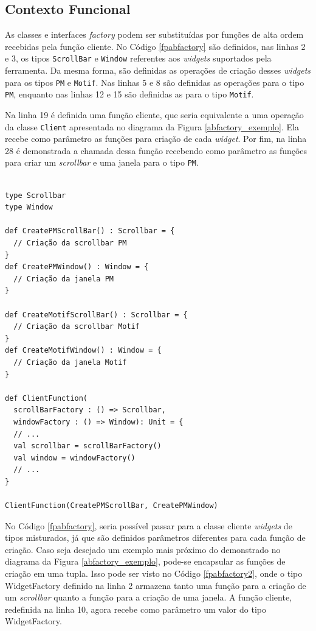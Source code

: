 \subsection*{Contexto Funcional}

As classes e interfaces \textit{factory} podem 
ser substituídas por funções de alta ordem 
recebidas pela função cliente. 
No Código \ref{fpabfactory} são definidos, 
nas linhas 2 e 3,  
os tipos \texttt{ScrollBar} e \texttt{Window} referentes aos 
\textit{widgets} suportados pela ferramenta. 
Da mesma forma, são definidas as operações de 
criação desses \textit{widgets} para os tipos 
\texttt{PM} e \texttt{Motif}. Nas linhas 5 e 8 são definidas as 
operações para o tipo \texttt{PM}, enquanto nas linhas 
12 e 15 são definidas as para o tipo \texttt{Motif}. 

Na linha 19 é definida uma função cliente, 
que seria equivalente a uma operação da classe 
\texttt{Client} apresentada no diagrama da Figura 
\ref{abfactory_exemplo}. Ela 
recebe como parâmetro as funções para criação de 
cada \textit{widget}. Por fim, na linha 28 é 
demonstrada a chamada dessa função recebendo 
como parâmetro as funções para criar um 
\textit{scrollbar} e uma janela para o tipo 
\texttt{PM}.

\begin{lstlisting}[caption={Abstract Factory Funcional.},label=fpabfactory]
    
type Scrollbar
type Window

def CreatePMScrollBar() : Scrollbar = {
  // Criação da scrollbar PM
}
def CreatePMWindow() : Window = {
  // Criação da janela PM
}

def CreateMotifScrollBar() : Scrollbar = {
  // Criação da scrollbar Motif
}
def CreateMotifWindow() : Window = {
  // Criação da janela Motif
}

def ClientFunction(
  scrollBarFactory : () => Scrollbar, 
  windowFactory : () => Window): Unit = {
  // ...
  val scrollbar = scrollBarFactory()
  val window = windowFactory()
  // ...
}

ClientFunction(CreatePMScrollBar, CreatePMWindow)

\end{lstlisting}

No Código \ref{fpabfactory}, seria possível passar 
para a classe cliente \textit{widgets} de tipos 
misturados, já que são definidos parâmetros 
diferentes para cada função de criação. Caso 
seja desejado um exemplo mais próximo do demonstrado 
no diagrama da Figura \ref{abfactory_exemplo}, 
pode-se encapsular as funções de criação 
em uma tupla. Isso pode ser visto no Código 
\ref{fpabfactory2}, onde o tipo WidgetFactory 
definido na linha 2 armazena tanto uma função 
para a criação de um \textit{scrollbar} quanto a função 
para a criação de uma janela. A função 
cliente, redefinida na linha 10, agora 
recebe como parâmetro um valor do tipo 
WidgetFactory.

